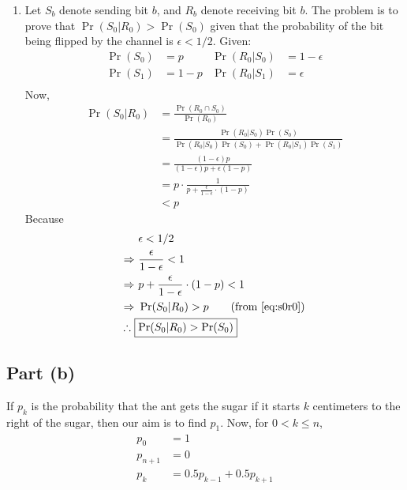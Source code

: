 \documentclass[11pt,a4paper,titlepage]{article}
\begin{document}
\begin{enumerate}
    \item Let $S_b$ denote sending bit $b$, and $R_b$ denote receiving bit $b$.
        The problem is to prove that $\Pr(S_0 | R_0) > \Pr(S_0)$ given that the
        probability of the bit being flipped by the channel is $\epsilon < 1/2$.
        Given:
        \begin{align*}
            \Pr(S_0) &= p & \Pr(R_0 | S_0) &= 1 - \epsilon \\
            \Pr(S_1) &= 1 - p & \Pr(R_0 | S_1) &= \epsilon \\
        \end{align*}
        Now,
        \begin{align}
            \Pr(S_0 | R_0) &= \frac{\Pr(R_0 \cap S_0)}{\Pr(R_0)} \nonumber \\
                           &= \frac{\Pr(R_0 | S_0) \Pr(S_0)}
                                   {\Pr(R_0 | S_0)\Pr(S_0) + \Pr(R_0 | S_1)\Pr(S_1)} \nonumber \\
                           &= \frac{(1 - \epsilon) p}
                                   {(1 - \epsilon) p + \epsilon (1 - p)} \nonumber \\
                           &= p \cdot \frac{1}{p + \frac{\epsilon}{1 - \epsilon} \cdot (1 - p)} \label{eq:s0r0} \\
                           &< p \nonumber
        \end{align}
        Because
        \begin{align*}
                        &\epsilon < 1/2 \\
            \Rightarrow~&\frac{\epsilon}{1 - \epsilon} < 1 \\
            \Rightarrow~&p + \frac{\epsilon}{1 - \epsilon} \cdot (1 - p) < 1 \\
            \Rightarrow~& \Pr(S_0 | R_0) > p \tag{from \ref{eq:s0r0}} \\
            \therefore~\Aboxed{&\Pr(S_0 | R_0) > \Pr(S_0)}
        \end{align*}
\end{enumerate}


\subsection*{Part (b)}

If $p_k$ is the probability that the ant gets the sugar if it starts $k$
centimeters to the right of the sugar, then our aim is to find $p_1$.
Now, for $0 < k \le n$,
\begin{align}
    p_0 &= 1 \nonumber \\
    p_{n+1} &= 0 \label{eq:p_n1} \\
    p_k &= 0.5 p_{k-1} + 0.5 p_{k+1} \label{eq:p_k}
\end{align}
\end{document}
